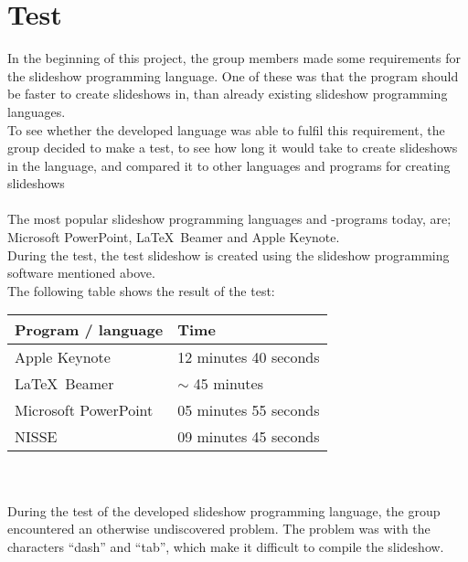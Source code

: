 \chapter{Test}
In the beginning of this project, the group members made some requirements for the slideshow programming language. One of these was that the program should be faster to create slideshows in, than already existing slideshow programming languages. \\
To see whether the developed language was able to fulfil this requirement, the group decided to make a test, to see how long it would take to create slideshows in the language, and compared it to other languages and programs for creating slideshows
\\ \\
The most popular slideshow programming languages and -programs today, are; Microsoft PowerPoint, \LaTeX~Beamer and Apple Keynote. \\
During the test, the test slideshow is created using the slideshow programming software mentioned above. \\
The following table shows the result of the test:

\begin{center}
   \begin{tabular}{ | l | l |}
    \hline
    Program / language & Time \\ \hline
    Apple Keynote & 12 minutes 40 seconds \\ \hline
    \LaTeX~Beamer & $\sim$ 45 minutes \\ \hline
    Microsoft PowerPoint & 05 minutes 55 seconds \\ \hline
    NISSE & 09 minutes 45 seconds \\ \hline
    \end{tabular}
\end{center}

\\ \\
During the test of the developed slideshow programming language, the group encountered an otherwise undiscovered problem. The problem was with the characters ``dash'' and ``tab'', which make it difficult to compile the slideshow.